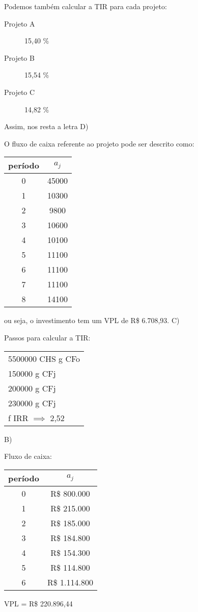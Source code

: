 \documentclass[a4paper]{report}
\begin{document}
Podemos também calcular a TIR para cada projeto:
\begin{description}
    \item[Projeto A] 15,40 \%
    \item[Projeto B] 15,54 \%
    \item[Projeto C] 14,82 \%
\end{description}

Assim, nos resta a letra D)


O fluxo de caixa referente ao projeto pode ser descrito como:
\begin{table}[H]
    \centering
    \begin{tabular}{c | c}
	período	& $a_j$ \\
	\hline
	0	& 45000 \\
	1	& 10300 \\
	2	& 9800  \\
	3	& 10600 \\
	4	& 10100 \\
	5	& 11100 \\
	6	& 11100 \\
	7	& 11100 \\
	8	& 14100 \\
    \end{tabular}
\end{table}
ou seja, o investimento tem um VPL de R\$ 6.708,93. C)


Passos para calcular a TIR:
\begin{table}[H]
    \centering
    \begin{tabular}{l}
5500000 CHS g CFo \\
150000 g CFj \\
200000 g CFj \\
230000 g CFj \\
f IRR $\implies$ 2,52
    \end{tabular}
\end{table}

B)


Fluxo de caixa:
\begin{table}[H]
    \centering
    \begin{tabular}{c | c}
	período	& $a_j$ \\
	\hline
	0	& R\$ 800.000 \\
	1	& R\$ 215.000 \\
	2	& R\$ 185.000 \\
	3	& R\$ 184.800 \\
	4	& R\$ 154.300 \\
	5	& R\$ 114.800 \\
	6	& R\$ 1.114.800\\
    \end{tabular}
\end{table}
VPL = R\$ 220.896,44
\end{document}
